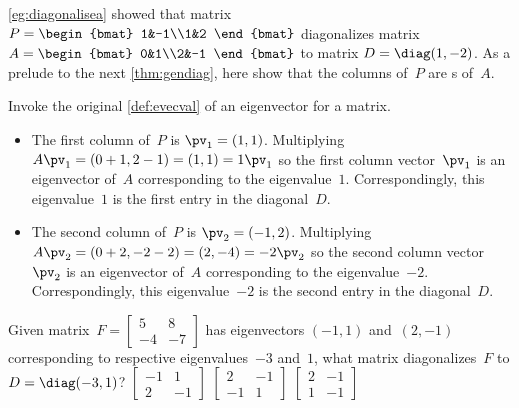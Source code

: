 \begin{example} 
\autoref{eg:diagonalisea} showed that matrix \(P=\begin{bmat} 1&-1\\1&2 \end{bmat}\) diagonalizes matrix \(A=\begin{bmat} 0&1\\2&-1 \end{bmat}\) to matrix \(D=\diag(1,-2)\). 
As a prelude to the next \autoref{thm:gendiag}, here show that the columns of~\(P\) are s of~\(A\).
\begin{solution} Invoke the original \autoref{def:evecval} of an eigenvector for a matrix.
\begin{itemize}
\item The first column of~\(P\) is \(\pv_1=(1,1)\).
Multiplying \(A\pv_1=(0+1,2-1)=(1,1)=1\pv_1\) so the first column vector~\(\pv_1\) is an eigenvector of~\(A\) corresponding to the eigenvalue~\(1\).
Correspondingly, this eigenvalue~\(1\) is the first entry in the diagonal~\(D\).

\item The second column of~\(P\) is \(\pv_2=(-1,2)\).
Multiplying \(A\pv_2=(0+2,-2-2)=(2,-4)=-2\pv_2\) so the second column vector~\(\pv_2\) is an eigenvector of~\(A\) corresponding to the eigenvalue~\(-2\).
Correspondingly, this eigenvalue~\(-2\) is the second entry in the diagonal~\(D\).
\end{itemize}
\end{solution}
\end{example}




\begin{activity}
Given matrix~\(F=\begin{bmatrix} 5&8\\-4&-7 \end{bmatrix}\) has eigenvectors \((-1,1)\) and~\((2,-1)\) corresponding to respective {eigenvalue}s~\(-3\) and~\(1\), what matrix diagonalizes~\(F\) to \(D=\diag(-3,1)\)?
{\(\begin{bmatrix} -1&1\\2&-1 \end{bmatrix}\)}
{\(\begin{bmatrix} 2&-1\\-1&1 \end{bmatrix}\)}
{\(\begin{bmatrix} 2&-1\\1&-1 \end{bmatrix}\)}
\end{activity}




